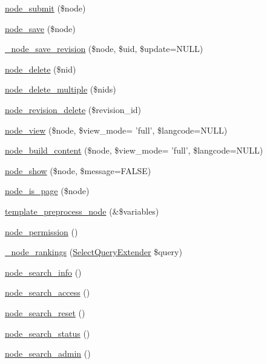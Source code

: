 \begin{DoxyCompactItemize}
\hyperlink{node_8module_ac61b7803b7fbcdb8e03cedc6138e3145}{node\_\-submit} (\$node)
\item 
\hyperlink{node_8module_a26add7591be64b30a18232927ef14faf}{node\_\-save} (\$node)
\item 
\hyperlink{node_8module_a43bc9486bf2d8a9c4e500d8aa3b5d702}{\_\-node\_\-save\_\-revision} (\$node, \$uid, \$update=NULL)
\item 
\hyperlink{node_8module_a707438913046b4959fa531386beb8024}{node\_\-delete} (\$nid)
\item 
\hyperlink{node_8module_ab7b4bed8dc18cfa2d8e1839b0429effa}{node\_\-delete\_\-multiple} (\$nids)
\item 
\hyperlink{node_8module_a0f00bdfa980e632ef1346027b9064b37}{node\_\-revision\_\-delete} (\$revision\_\-id)
\item 
\hyperlink{node_8module_ac2c64fdfacc25be79a6ecf406ab62320}{node\_\-view} (\$node, \$view\_\-mode= 'full', \$langcode=NULL)
\item 
\hyperlink{node_8module_ab1cfacf1a2915e383e2c777d6c10b4c0}{node\_\-build\_\-content} (\$node, \$view\_\-mode= 'full', \$langcode=NULL)
\item 
\hyperlink{node_8module_a009f1685fb132153f1590c318ffb949a}{node\_\-show} (\$node, \$message=FALSE)
\item 
\hyperlink{node_8module_ad026ffabfa7f044686789dae126d99a9}{node\_\-is\_\-page} (\$node)
\item 
\hyperlink{node_8module_abba818ede4c18fb7d92f0a5d5f1aa771}{template\_\-preprocess\_\-node} (\&\$variables)
\item 
\hyperlink{node_8module_a13de7a5099581f4a40ab82c52d632c68}{node\_\-permission} ()
\item 
\hyperlink{node_8module_ae44d40f8a64bf935ce7c6fce9af6425b}{\_\-node\_\-rankings} (\hyperlink{classSelectQueryExtender}{SelectQueryExtender} \$query)
\item 
\hyperlink{node_8module_a37b324db553dbb556ae8932d72bf1fba}{node\_\-search\_\-info} ()
\item 
\hyperlink{node_8module_a2fca75042f74ce9312bf000b0d9dd6ea}{node\_\-search\_\-access} ()
\item 
\hyperlink{node_8module_a6e9bd2c7f38cc740261f21679c656d32}{node\_\-search\_\-reset} ()
\item 
\hyperlink{node_8module_a94fbf3616adf60ed473c6dd5615568ac}{node\_\-search\_\-status} ()
\item 
\hyperlink{node_8module_a68eda145ae4169ab8ed713b50ff035c8}{node\_\-search\_\-admin} ()
\item 

\end{DoxyCompactItemize}
